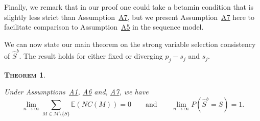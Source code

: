 \documentclass[bj,authoryear]{imsart}
\theoremstyle{plain}
\newtheorem{thm}{\textsc{Theorem}}[section]
\newcommand{\david}[1]{{\small{\color{blue} \sf $\heartsuit$ [David: #1]}}}
\newcommand{\paul}[1]{{\small{\color{green} \sf $\spadesuit$ Paul: #1}}}
\newcommand{\E}{\mathbb{E}}
\newcommand{\M}{\mathcal{M}}
\newcommand{\bs}{\boldsymbol}
\begin{document}
Finally, we remark that in our proof one could take a betamin condition that is slightly less strict than Assumption~\hyperlink{lab:A7}{A7}, but we present Assumption~\hyperlink{lab:A7}{A7} here to facilitate comparison to Assumption~\hyperlink{lab:A5}{A5} in the sequence model.  


We can now state our main theorem on the strong variable selection consistency of $\hat{S}^{b}$. The result holds for either fixed or diverging $p_j-s_j$ and $s_j$. %
\begin{thm}\label{theo:suffcondlinearmodel}

Under Assumptions~\hyperlink{lab:A1}{A1}, \hyperlink{lab:A6}{A6} and, \hyperlink{lab:A7}{A7}, we have
$$\lim_{n \to \infty} \sum_{M \in \M\setminus \{S\}}\E\left(NC(M)\right)= 0 \qquad \mbox{and} \qquad \lim_{n \to \infty} P(\hat{S}^b = S)= 1.$$
\end{thm}
\end{document}

